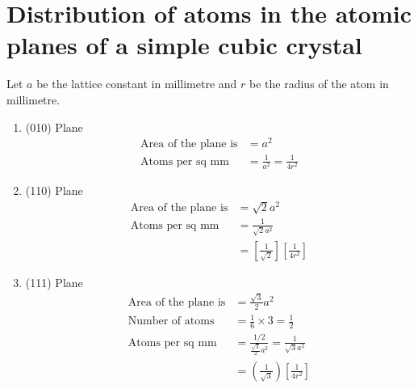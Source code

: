 \section{Distribution of atoms in the atomic planes of a simple cubic crystal}
	Let $a$ be the lattice constant in millimetre and $r$ be the radius of the atom in millimetre.
\begin{enumerate}
	\item (010) Plane \\
	\begin{align*}
	\text{Area of the plane is} &= a^{2}\\
	\text{Atoms per sq $\mathrm{mm}$ }&=\frac{1}{a^{2}}=\frac{1}{4 r^{2}}
	\end{align*}

	\item (110) Plane
		\begin{align*}
	\text{Area of the plane is} &=\sqrt{2} a^{2}\\
	\text{Atoms per sq $\mathrm{mm}$ }&=\frac{1}{\sqrt{2} a^{2}}\\&=\left[\frac{1}{\sqrt{2}}\right]\left[\frac{1}{4 r^{2}}\right]
	\end{align*}

	\item  (111) Plane
	\begin{align*}
	\text{Area of the plane is} &=\frac{\sqrt{3}}{2} a^{2}\\
	 \text{Number of atoms} &=\frac{1}{6} \times 3=\frac{1}{2}\\
	\text{Atoms per sq $\mathrm{mm}$ }&=\frac{1 / 2}{\frac{\sqrt{3}}{2} a^{2}}=\frac{1}{\sqrt{3} a^{2}}\\&=\left(\frac{1}{\sqrt{3}}\right)\left[\frac{1}{4 r^{2}}\right]
\end{align*}

\end{enumerate}


